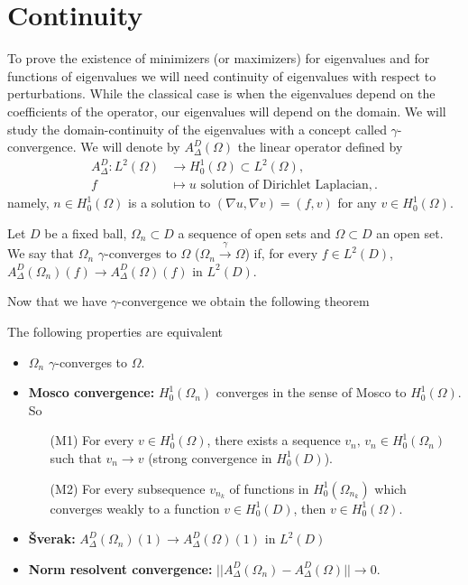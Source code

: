 \section{Continuity}
To prove the existence of minimizers (or maximizers) for eigenvalues and for functions of eigenvalues we will need continuity of eigenvalues with respect to perturbations.
While the classical case is when the eigenvalues depend on the coefficients of the operator, our eigenvalues will depend on the domain.
We will study the domain-continuity of the eigenvalues with a concept called $\gamma$-convergence.
We will denote by $A_{\Delta}^{D}(\Omega)$ the linear operator defined by 
\begin{align*}
  A_{\Delta}^{D} : L^{2}(\Omega) &\to H_{0}^{1}(\Omega) \subset L^{2}(\Omega), \\
  f &\mapsto u \text{ solution of Dirichlet Laplacian},
.\end{align*}
namely, $n \in H_{0}^{1}(\Omega)$ is a solution to $\left( \nabla u, \nabla v \right) = \left( f,v \right)$ for any $v \in H_{0}^{1}(\Omega)$.
\begin{definition}
  Let $D$ be a fixed ball, $\Omega_{n} \subset D$ a sequence of open sets and $\Omega \subset D$ an open set.
  We say that $\Omega_{n}$ $\gamma$-converges to $\Omega$ ($\Omega_{n} \xrightarrow{\gamma} \Omega$) if, for every $f \in L^{2}(D)$, $A_{\Delta}^{D}(\Omega_{n})(f) \to A_{\Delta}^{D}(\Omega)(f)$ in $L^{2}(D)$.
\end{definition}
Now that we have $\gamma$-convergence we obtain the following theorem \cite{convergence}
\begin{theorem}
  The following properties are equivalent
  \begin{itemize}
    \item $\Omega_{n}$ $\gamma$-converges to $\Omega$.
    \item \textbf{Mosco convergence:} $H_{0}^{1}(\Omega_{n})$ converges in the sense of Mosco to $H_{0}^{1}(\Omega)$. So
      \begin{enumerate}
        \item[(M1)] For every $v \in H_{0}^{1}(\Omega)$, there exists a sequence $v_{n}, \, v_{n} \in H_{0}^{1}(\Omega_{n})$ such that $v_{n} \to v$ (strong convergence in $H_{0}^{1}(D)$).
        \item[(M2)] For every subsequence $v_{n_{k}}$ of functions in $H_{0}^{1}(\Omega_{n_{k}})$ which converges weakly to a function $v \in H_{0}^{1}(D)$, then $v \in H_{0}^{1}(\Omega)$.
      \end{enumerate}
    \item \textbf{Šverak:} $A_{\Delta}^{D}(\Omega_{n})(1) \to A_{\Delta}^{D}(\Omega)(1)$ in $L^{2}(D)$
    \item \textbf{Norm resolvent convergence:} $|| A_{\Delta}^{D}(\Omega_{n}) - A_{\Delta}^{D}(\Omega) || \to 0$.
  \end{itemize}
\end{theorem}

